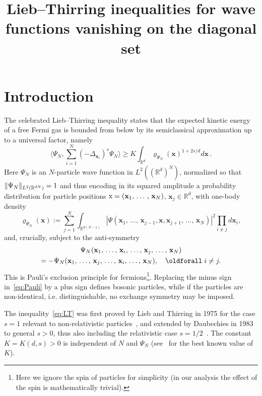 \documentclass[AHL, Unicode, longabstracts, published]{cedram}
\title[Lieb--Thirring inequalities for wave functions vanishing on the diagonal set]{Lieb--Thirring inequalities for wave functions vanishing on the diagonal set}
\author{\firstname{Simon} \lastname{Larson}}
\author{\firstname{Douglas} \lastname{Lundholm}}
\author{\firstname{Phan Thành} \lastname{Nam}}
\newcommand*\R {\mathbb{R}}
\newcommand\1{{\ensuremath {\mathds 1} }}
\newcommand{\bx}{\mathbf{x}}
\newcommand{\sx}{\textup{x}}
\renewcommand*{\forall}{\mathrel{\oldforall}}
\begin{document}
\maketitle

\section{Introduction}

The celebrated Lieb--Thirring inequality states that the expected kinetic energy of a free Fermi gas is bounded from below by its semiclassical approximation up to a universal factor, namely
\begin{equation}\label{eq:LT}
\biggl\langle \Psi_N, \sum_{i=1}^N (-\Delta_{\bx_i})^s \Psi_N\biggr\rangle
\ge K \int_{\R^d} \varrho_{\Psi_N}(\bx)^{1+2s/d} d\bx\,.
\end{equation}
Here $\Psi_N$ is an $N$-particle wave function in $L^2((\R^d)^N)$, normalized so that $\|\Psi_N\|_{L^2(\R^{dN})}\linebreak=1$ and thus encoding in its squared amplitude a probability distribution for particle positions $\sx = (\bx_1,\,\ldots\,,\,\bx_N)$, $\bx_j \in \R^d$, with one-body density
\[
\varrho_{\Psi_N}(\bx) := \sum_{j=1}^N \int_{\R^{d(N-1)}} \left|\Psi(\bx_1,\,\dots,\,\bx_{j-1},\bx,\bx_{j+1},\,\dots,\,\bx_N)\right|^2 \prod\limits_{i\ne j} d\bx_i,
\]
and, crucially, subject to the anti-symmetry
\begin{multline}\label{eq:Pauli}
\Psi_N(\bx_1,\,\ldots,\,\bx_i,\,\ldots,\,\bx_j,\,\ldots,\,\bx_N)\\
= - \Psi_N(\bx_1,\,\ldots,\,\bx_j,\,\ldots,\,\bx_i,\,\ldots,\,\bx_N), \quad \forall i\ne j.
\end{multline}
This is Pauli's exclusion principle for fermions\footnote{ Here we ignore the spin of particles for simplicity (in our analysis the effect of the spin is mathematically trivial).}. Replacing the minus sign in~\eqref{eq:Pauli} by a plus sign defines bosonic particles, while if the particles are non-identical, i.e. distinguishable, no exchange symmetry may be imposed.

The inequality~\eqref{eq:LT} was first proved by Lieb and Thirring in 1975 for the case $s=1$ relevant to non-relativistic particles~\cite{LieThi-75,LieThi-76}, and extended by Daubechies in 1983 to general $s>0$, thus also including the relativistic case $s=1/2$~\cite{Daubechies-83}. The constant $K=K(d,s)>0$ is independent of $N$ and $\Psi_N$ (see~\cite{FraHunJexNam-18} for the best known value of $K$).
\end{document}
